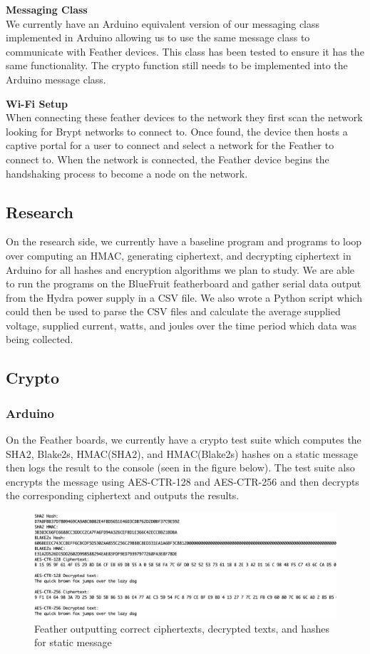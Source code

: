 \documentclass[tikz,a4paper,titlepage]{article}
\begin{document}
\textbf{Messaging Class}
\\
We currently have an Arduino equivalent version of our messaging class implemented in Arduino allowing us to use the same message class to communicate with Feather devices. This class has been tested to ensure it has the same functionality. The crypto function still needs to be implemented into the Arduino message class.

\textbf{Wi-Fi Setup}
\\
When connecting these feather devices to the network they first scan the network looking for Brypt networks to connect to. Once found, the device then hosts a captive portal for a user to connect and select a network for the Feather to connect to. When the network is connected, the Feather device begins the handshaking process to become a node on the network.

\subsection{Research}
On the research side, we currently have a baseline program and programs to loop over computing an HMAC, generating ciphertext, and decrypting ciphertext in Arduino for all hashes and encryption algorithms we plan to study. We are able to run the programs on the BlueFruit featherboard and gather serial data output from the Hydra power supply in a CSV file. We also wrote a Python script which could then be used to parse the CSV files and calculate the average supplied voltage, supplied current, watts, and joules over the time period which data was being collected. 

\subsection{Crypto}

\subsubsection{Arduino}

On the Feather boards, we currently have a crypto test suite which computes the SHA2, Blake2s, HMAC(SHA2), and HMAC(Blake2s) hashes on a static message then logs the result to the console (seen in the figure below). The test suite also encrypts the message using AES-CTR-128 and AES-CTR-256 and then decrypts the corresponding ciphertext and outputs the results.

\begin{figure}[H]
  \centering
    \includegraphics[scale=.26]{arduino-crypto.png}
    \caption{Feather outputting correct ciphertexts, decrypted texts, and hashes for static message}
\end{figure}
\pagebreak
\end{document}
